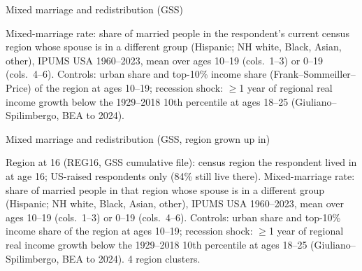 \documentclass[aspectratio=169]{beamer}
\begin{document}
\begin{frame}{Mixed marriage and redistribution (GSS)}

\begin{table}
    \centering
    \scalebox{0.79}{\parbox{\linewidth}{\centering\tiny\setlength{\tabcolsep}{4pt}\renewcommand{\arraystretch}{0.72}
    }}
\end{table}
\vspace{-0.6em}
{\tiny Mixed-marriage rate: share of married people in the respondent's current census region whose spouse is in a different group (Hispanic; NH white, Black, Asian, other), IPUMS USA 1960--2023, mean over ages 10--19 (cols.\ 1--3) or 0--19 (cols.\ 4--6). Controls: urban share and top-10\% income share (Frank--Sommeiller--Price) of the region at ages 10--19; recession shock: $\geq$1 year of regional real income growth below the 1929--2018 10th percentile at ages 18--25 (Giuliano--Spilimbergo, BEA to 2024).\par}

\end{frame}


\begin{frame}{Mixed marriage and redistribution (GSS, region grown up in)}

\begin{table}
    \centering
    \scalebox{0.79}{\parbox{\linewidth}{\centering\tiny\setlength{\tabcolsep}{4pt}\renewcommand{\arraystretch}{0.72}
    }}
\end{table}
\vspace{-0.6em}
{\tiny Region at 16 (REG16, GSS cumulative file): census region the respondent lived in at age 16; US-raised respondents only (84\% still live there). Mixed-marriage rate: share of married people in that region whose spouse is in a different group (Hispanic; NH white, Black, Asian, other), IPUMS USA 1960--2023, mean over ages 10--19 (cols.\ 1--3) or 0--19 (cols.\ 4--6). Controls: urban share and top-10\% income share of the region at ages 10--19; recession shock: $\geq$1 year of regional real income growth below the 1929--2018 10th percentile at ages 18--25 (Giuliano--Spilimbergo, BEA to 2024). 4 region clusters.\par}

\end{frame}
\end{document}
